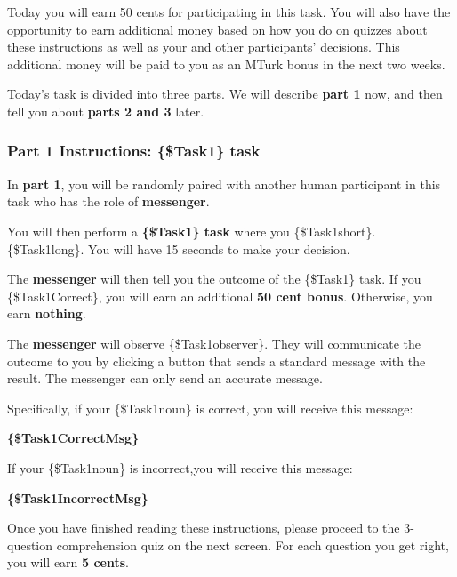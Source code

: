 \begin{description}[listparindent = 1.5em]
\item[Overview Instructions] \hspace{1cm}

Today you will earn 50 cents for participating in this task. You
will also have the opportunity to earn additional money based on how you do on
quizzes about these instructions as well as your and other participants'
decisions. This additional money will be paid to you as an MTurk bonus in the
next two weeks. 

Today's task is divided into three parts. We will describe \textbf{part
1} now, and then tell you about \textbf{parts 2 and 3} later.
\end{description}

\subsubsection*{Part 1 Instructions: \{\$Task1\} task}

In \textbf{part 1}, you will be randomly paired
with another human participant in this task who has the role of \textbf{messenger}. 

You
will then perform a \textbf{\{\$Task1\} task} where you \{\$Task1short\}. \{\$Task1long\}. You
will have 15 seconds to make your decision.

The \textbf{messenger} will then tell you the
outcome of the \{\$Task1\} task. If you \{\$Task1Correct\}, you will earn an additional
\textbf{50 cent bonus}. Otherwise, you earn \textbf{nothing}. 

The \textbf{messenger} will observe
\{\$Task1observer\}. They will communicate the outcome to you by clicking a button
that sends a standard message with the result. The messenger can only send an
accurate message. 

Specifically, if your \{\$Task1noun\} is correct,
you will receive this message: 

\textbf{\{\$Task1CorrectMsg\}}

If your \{\$Task1noun\} is incorrect,you will receive this message: 

\textbf{\{\$Task1IncorrectMsg\}}

Once you have finished reading these instructions, please proceed to the
3-question comprehension quiz on the next screen. For each question you get
right, you will earn \textbf{5 cents}.

